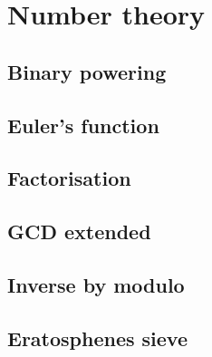 \documentclass[12pt,a4paper]{article}
\begin{document}


\section{Number theory} 

\subsection{Binary powering}



\subsection{Euler's function}



\subsection{Factorisation}



\subsection{GCD extended}



\subsection{Inverse by modulo}




\subsection{Eratosphenes sieve}
\end{document}
